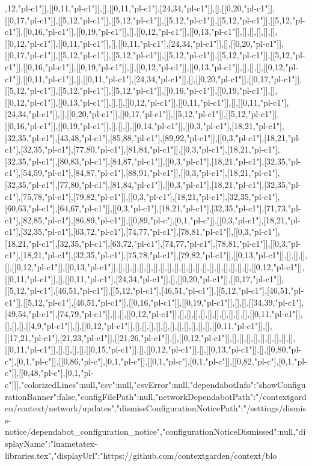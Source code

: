 ,12,"pl-c1"]],[[0,11,"pl-c1"]],[],[[0,11,"pl-c1"],[24,34,"pl-c1"]],[],[[0,20,"pl-c1"]],[[0,17,"pl-c1"]],[[5,12,"pl-c1"]],[[5,12,"pl-c1"]],[[5,12,"pl-c1"]],[[5,12,"pl-c1"]],[[5,12,"pl-c1"]],[[0,16,"pl-c1"]],[[0,19,"pl-c1"]],[],[[0,12,"pl-c1"]],[[0,13,"pl-c1"]],[],[],[],[],[],[[0,12,"pl-c1"]],[[0,11,"pl-c1"]],[],[[0,11,"pl-c1"],[24,34,"pl-c1"]],[],[[0,20,"pl-c1"]],[[0,17,"pl-c1"]],[[5,12,"pl-c1"]],[[5,12,"pl-c1"]],[[5,12,"pl-c1"]],[[5,12,"pl-c1"]],[[5,12,"pl-c1"]],[[0,16,"pl-c1"]],[[0,19,"pl-c1"]],[],[[0,12,"pl-c1"]],[[0,13,"pl-c1"]],[],[],[],[[0,12,"pl-c1"]],[[0,11,"pl-c1"]],[],[[0,11,"pl-c1"],[24,34,"pl-c1"]],[],[[0,20,"pl-c1"]],[[0,17,"pl-c1"]],[[5,12,"pl-c1"]],[[5,12,"pl-c1"]],[[5,12,"pl-c1"]],[[0,16,"pl-c1"]],[[0,19,"pl-c1"]],[],[[0,12,"pl-c1"]],[[0,13,"pl-c1"]],[],[],[[0,12,"pl-c1"]],[[0,11,"pl-c1"]],[],[[0,11,"pl-c1"],[24,34,"pl-c1"]],[],[[0,20,"pl-c1"]],[[0,17,"pl-c1"]],[[5,12,"pl-c1"]],[[5,12,"pl-c1"]],[[0,16,"pl-c1"]],[[0,19,"pl-c1"]],[],[],[],[[0,14,"pl-c1"]],[[0,3,"pl-c1"],[18,21,"pl-c1"],[32,35,"pl-c1"],[43,48,"pl-c1"],[85,88,"pl-c1"],[89,92,"pl-c1"]],[[0,3,"pl-c1"],[18,21,"pl-c1"],[32,35,"pl-c1"],[77,80,"pl-c1"],[81,84,"pl-c1"]],[[0,3,"pl-c1"],[18,21,"pl-c1"],[32,35,"pl-c1"],[80,83,"pl-c1"],[84,87,"pl-c1"]],[[0,3,"pl-c1"],[18,21,"pl-c1"],[32,35,"pl-c1"],[54,59,"pl-c1"],[84,87,"pl-c1"],[88,91,"pl-c1"]],[[0,3,"pl-c1"],[18,21,"pl-c1"],[32,35,"pl-c1"],[77,80,"pl-c1"],[81,84,"pl-c1"]],[[0,3,"pl-c1"],[18,21,"pl-c1"],[32,35,"pl-c1"],[75,78,"pl-c1"],[79,82,"pl-c1"]],[[0,3,"pl-c1"],[18,21,"pl-c1"],[32,35,"pl-c1"],[60,63,"pl-c1"],[64,67,"pl-c1"]],[[0,3,"pl-c1"],[18,21,"pl-c1"],[32,35,"pl-c1"],[71,73,"pl-c1"],[82,85,"pl-c1"],[86,89,"pl-c1"]],[[0,89,"pl-c"],[0,1,"pl-c"]],[[0,3,"pl-c1"],[18,21,"pl-c1"],[32,35,"pl-c1"],[63,72,"pl-c1"],[74,77,"pl-c1"],[78,81,"pl-c1"]],[[0,3,"pl-c1"],[18,21,"pl-c1"],[32,35,"pl-c1"],[63,72,"pl-c1"],[74,77,"pl-c1"],[78,81,"pl-c1"]],[[0,3,"pl-c1"],[18,21,"pl-c1"],[32,35,"pl-c1"],[75,78,"pl-c1"],[79,82,"pl-c1"]],[[0,13,"pl-c1"]],[],[],[],[],[[0,12,"pl-c1"]],[[0,13,"pl-c1"]],[],[],[],[],[],[],[],[],[],[],[],[],[],[],[],[],[],[],[],[[0,12,"pl-c1"]],[[0,11,"pl-c1"]],[],[[0,11,"pl-c1"],[24,34,"pl-c1"]],[],[[0,20,"pl-c1"]],[[0,17,"pl-c1"]],[[5,12,"pl-c1"],[46,51,"pl-c1"]],[[5,12,"pl-c1"],[46,51,"pl-c1"]],[[5,12,"pl-c1"],[46,51,"pl-c1"]],[[5,12,"pl-c1"],[46,51,"pl-c1"]],[[0,16,"pl-c1"]],[[0,19,"pl-c1"]],[],[],[[34,39,"pl-c1"],[49,54,"pl-c1"],[74,79,"pl-c1"]],[],[],[[0,12,"pl-c1"]],[],[],[],[],[],[],[],[],[],[],[[0,11,"pl-c1"]],[],[],[],[[4,9,"pl-c1"]],[],[[0,12,"pl-c1"]],[],[],[],[],[],[],[],[],[],[],[],[[0,11,"pl-c1"]],[],[[17,21,"pl-c1"],[21,23,"pl-c1"]],[[21,26,"pl-c1"]],[],[[0,12,"pl-c1"]],[],[],[],[],[],[],[],[],[],[[0,11,"pl-c1"]],[],[],[],[],[[0,15,"pl-c1"]],[],[[0,12,"pl-c1"]],[],[[0,13,"pl-c1"]],[],[[0,80,"pl-c"],[0,1,"pl-c"]],[[0,86,"pl-c"],[0,1,"pl-c"]],[[0,1,"pl-c"],[0,1,"pl-c"]],[[0,82,"pl-c"],[0,1,"pl-c"]],[[0,48,"pl-c"],[0,1,"pl-c"]]],"colorizedLines":null,"csv":null,"csvError":null,"dependabotInfo":{"showConfigurationBanner":false,"configFilePath":null,"networkDependabotPath":"/contextgarden/context/network/updates","dismissConfigurationNoticePath":"/settings/dismiss-notice/dependabot_configuration_notice","configurationNoticeDismissed":null},"displayName":"luametatex-libraries.tex","displayUrl":"https://github.com/contextgarden/context/blo